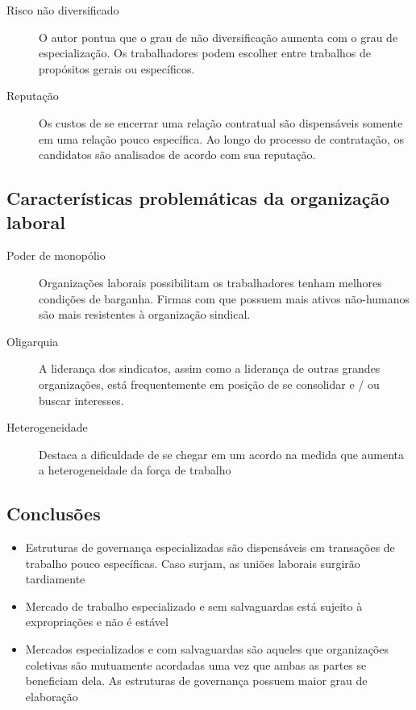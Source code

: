 \begin{description}
	\item[Risco não diversificado] O autor pontua que o grau de não diversificação aumenta com o grau de especialização. Os trabalhadores podem escolher entre trabalhos de propósitos gerais ou específicos.
	\item[Reputação] Os custos de se encerrar uma relação contratual são dispensáveis somente em uma relação pouco específica. Ao longo do processo de contratação, os candidatos são analisados de acordo com sua reputação.
\end{description}


\subsection*{Características problemáticas da organização laboral}

\begin{description}
	\item[Poder de monopólio] Organizações laborais possibilitam os trabalhadores tenham melhores condições de barganha. Firmas com que possuem mais ativos não-humanos são mais resistentes à organização sindical.
	\item[Oligarquia] A liderança dos sindicatos, assim como a liderança de outras grandes organizações, está frequentemente em posição de se consolidar e / ou buscar interesses.
	\item[Heterogeneidade] Destaca a dificuldade de se chegar em um acordo na medida que aumenta a heterogeneidade da força de trabalho
\end{description}

\subsection*{Conclusões}


\begin{itemize}
	\item Estruturas de governança especializadas são dispensáveis em transações de trabalho pouco específicas. Caso surjam, as uniões laborais surgirão tardiamente
	\item Mercado de trabalho especializado e sem salvaguardas está sujeito à expropriações e não é estável
	\item Mercados especializados e com salvaguardas são aqueles que organizações coletivas são mutuamente acordadas uma vez que ambas as partes se beneficiam dela. As estruturas de governança possuem maior grau de elaboração
\end{itemize}